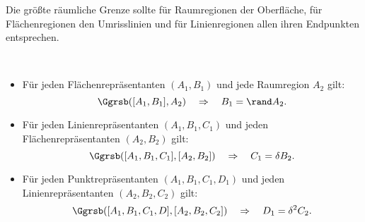     Die größte räumliche Grenze sollte für Raumregionen der Oberfläche, für Flächenregionen den Umrisslinien und für Linienregionen allen ihren Endpunkten entsprechen.
    \begin{satz}[$\Ggrsb$]\ \vspace{0pt} 

        \begin{itemize}
            \item Für jeden Flächenrepräsentanten $(A_1,B_1)$ und jede Raumregion $A_2$ gilt:
                $$\Ggrsb([A_1,B_1],A_2) \quad \Rightarrow \quad B_1 = \rand A_2.$$
            \item Für jeden Linienrepräsentanten $(A_1,B_1,C_1)$ und jeden Flächenrepräsentanten $(A_2,B_2)$ gilt:
                $$\Ggrsb([A_1,B_1,C_1],[A_2,B_2]) \quad \Rightarrow \quad C_1 = \delta B_2.$$
            \item Für jeden Punktrepräsentanten $(A_1,B_1,C_1,D_1)$ und jeden Linienrepräsentanten $(A_2,B_2,C_2)$ gilt:
                $$\Ggrsb([A_1,B_1,C_1,D],[A_2,B_2,C_2]) \quad \Rightarrow \quad D_1 = \delta^2 C_2.$$
        \end{itemize}

    \end{satz}
